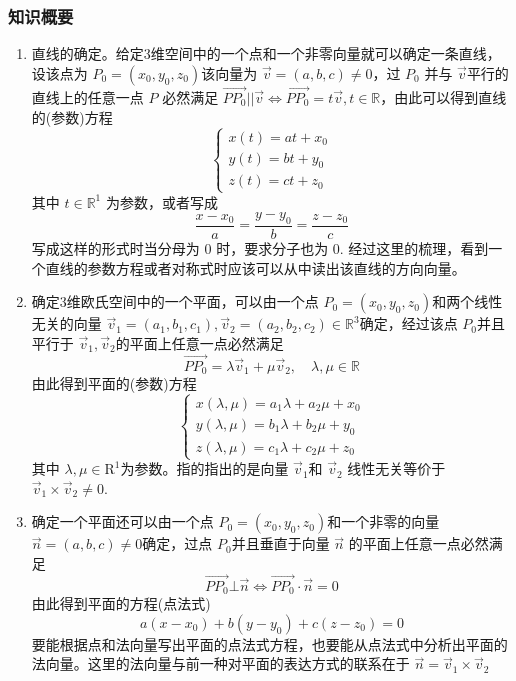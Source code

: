 \subsubsection{知识概要}
\begin{enumerate}
   \item 直线的确定。给定3维空间中的一个点和一个非零向量就可以确定一条直线，设该点为 $P_0 = (x_0, y_0, z_0)$该向量为 $\vec{v} = (a,b,c) \neq 0$，过 $P_0$ 并与 $\vec{v}$平行的直线上的任意一点 $P$ 必然满足 $ \vec{ P P_0} || \vec{v} \Leftrightarrow \vec{P P_0} = t \vec{v} , t \in \mathbb{R} $，由此可以得到直线的(参数)方程
    $$
    \begin{cases}
        x(t) = a t + x_0 \\
        y(t) = b t + y_0 \\
        z(t) = c t + z_0
    \end{cases}
    $$
    其中 $t \in \mathbb{R} ^1$ 为参数，或者写成
    $$
    \frac{x-x_0}{a}=\frac{y-y_0}{b}=\frac{z-z_0}{c}
    $$
    写成这样的形式时当分母为 $0$ 时，要求分子也为 $0$. 经过这里的梳理，看到一个直线的参数方程或者对称式时应该可以从中读出该直线的方向向量。

    \item 确定3维欧氏空间中的一个平面，可以由一个点 $P_0 = (x_0, y_0, z_0)$和两个线性无关的向量 $ \vec{v}_1 = (a_1,b_1,c_1), \vec{v}_2 = (a_2,b_2,c_2) \in \mathbb{R}^3$确定，经过该点 $P_0$并且平行于 $\vec{v}_1, \vec{v}_2$的平面上任意一点必然满足
    $$
    \vec{P P_0} = \lambda \vec{v}_1 + \mu \vec{v}_2, \quad \lambda, \mu \in \mathbb{R}
    $$
    由此得到平面的(参数)方程
    $$
    \begin{cases}
        x(\lambda, \mu) = a_1 \lambda + a_2 \mu + x_0 \\
        y(\lambda, \mu) = b_1 \lambda + b_2 \mu + y_0 \\
        z(\lambda, \mu) = c_1 \lambda + c_2 \mu + z_0
    \end{cases}
    $$
    其中 $\lambda, \mu \in \mathrm{R} ^1 $为参数。指的指出的是向量 $\vec{v}_1$和 $\vec{v}_2$ 线性无关等价于 $\vec{v}_1 \times \vec{v}_2 \neq 0$.

    \item 确定一个平面还可以由一个点 $P_0 = (x_0, y_0, z_0)$和一个非零的向量 $ \vec{n} = (a,b,c) \neq 0 $确定，过点 $P_0$并且垂直于向量 $\vec{n}$ 的平面上任意一点必然满足 
    $$
    \vec{ P P_0} \bot \vec{n} \Leftrightarrow \vec{P P_0} \cdot \vec{n} = 0
    $$
    由此得到平面的方程(点法式)
    $$
    a(x-x_0) + b(y - y_0) + c (z - z_0) = 0
    $$
    要能根据点和法向量写出平面的点法式方程，也要能从点法式中分析出平面的法向量。这里的法向量与前一种对平面的表达方式的联系在于 $\vec{n} = \vec{v}_1 \times \vec{v}_2 $


\end{enumerate}
